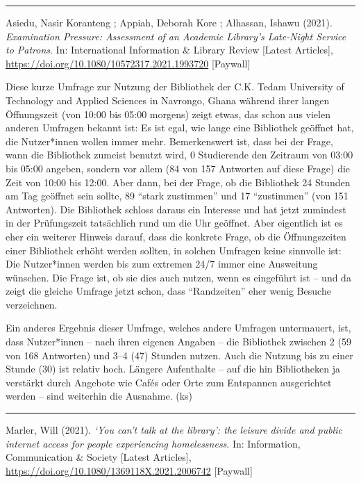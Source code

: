 \documentclass[a4paper,
fontsize=11pt,
oneside,
numbers=noperiodatend,
parskip=half-,
bibliography=totoc,
final
]{scrartcl}
\begin{document}
\begin{center}\rule{0.5\linewidth}{0.5pt}\end{center}

Asiedu, Nasir Koranteng ; Appiah, Deborah Kore ; Alhassan, Ishawu
(2021). \emph{Examination Pressure: Assessment of an Academic Library's
Late-Night Service to Patrons}. In: International Information \& Library
Review {[}Latest Articles{]},
\url{https://doi.org/10.1080/10572317.2021.1993720} {[}Paywall{]}

Diese kurze Umfrage zur Nutzung der Bibliothek der C.K. Tedam University
of Technology and Applied Sciences in Navrongo, Ghana während ihrer
langen Öffnungszeit (von 10:00 bis 05:00 morgens) zeigt etwas, das schon
aus vielen anderen Umfragen bekannt ist: Es ist egal, wie lange eine
Bibliothek geöffnet hat, die Nutzer*innen wollen immer mehr.
Bemerkenswert ist, dass bei der Frage, wann die Bibliothek zumeist
benutzt wird, 0 Studierende den Zeitraum von 03:00 bis 05:00 angeben,
sondern vor allem (84 von 157 Antworten auf diese Frage) die Zeit von
10:00 bis 12:00. Aber dann, bei der Frage, ob die Bibliothek 24 Stunden
am Tag geöffnet sein sollte, 89 \enquote{stark zustimmen} und 17
\enquote{zustimmen} (von 151 Antworten). Die Bibliothek schloss daraus
ein Interesse und hat jetzt zumindest in der Prüfungszeit tatsächlich
rund um die Uhr geöffnet. Aber eigentlich ist es eher ein weiterer
Hinweis darauf, dass die konkrete Frage, ob die Öffnungszeiten einer
Bibliothek erhöht werden sollten, in solchen Umfragen keine sinnvolle
ist: Die Nutzer*innen werden bis zum extremen 24/7 immer eine Ausweitung
wünschen. Die Frage ist, ob sie dies auch nutzen, wenn es eingeführt ist
-- und da zeigt die gleiche Umfrage jetzt schon, dass
\enquote{Randzeiten} eher wenig Besuche verzeichnen.

Ein anderes Ergebnis dieser Umfrage, welches andere Umfragen
untermauert, ist, dass Nutzer*innen -- nach ihren eigenen Angaben -- die
Bibliothek zwischen 2 (59 von 168 Antworten) und 3--4 (47) Stunden
nutzen. Auch die Nutzung bis zu einer Stunde (30) ist relativ hoch.
Längere Aufenthalte -- auf die hin Bibliotheken ja verstärkt durch
Angebote wie Cafés oder Orte zum Entspannen ausgerichtet werden -- sind
weiterhin die Ausnahme. (ks)

\begin{center}\rule{0.5\linewidth}{0.5pt}\end{center}

Marler, Will (2021). \emph{\enquote*{You can't talk at the library}: the
leisure divide and public internet access for people experiencing
homelessness}. In: Information, Communication \& Society {[}Latest
Articles{]}, \url{https://doi.org/10.1080/1369118X.2021.2006742}
{[}Paywall{]}
\end{document}
